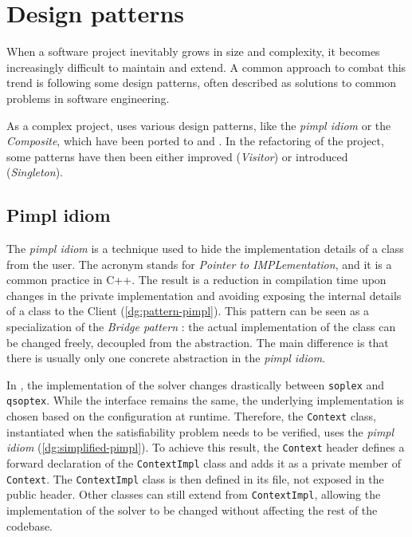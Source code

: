 \section{Design patterns}
\label{sec:patterns}

When a software project inevitably grows in size and complexity, it becomes increasingly difficult to maintain and extend.
A common approach to combat this trend is following some design patterns, often described as solutions to common problems in software engineering.

As a complex project, \dreal uses various design patterns, like the \textit{pimpl idiom} or the \textit{Composite}, which have been ported to \dlinearfour and \dlinear.
In the refactoring of the project, some patterns have then been either improved (\textit{Visitor}) or introduced (\textit{Singleton}).

\subsection*{Pimpl idiom}

The \textit{pimpl idiom} \cite{man:pimpl} is a technique used to hide the implementation details of a class from the user.
The acronym stands for \textit{Pointer to IMPLementation}, and it is a common practice in C++.
The result is a reduction in compilation time upon changes in the private implementation and avoiding exposing the internal details of a class to the Client (\autoref{dg:pattern-pimpl}).
This pattern can be seen as a specialization of the \textit{Bridge pattern} \cite{book:gof}: the actual implementation of the class can be changed freely, decoupled from the abstraction.
The main difference is that there is usually only one concrete abstraction in the \textit{pimpl idiom}.


In \dlinear, the implementation of the solver changes drastically between \texttt{soplex} and \texttt{qsoptex}.
While the interface remains the same, the underlying implementation is chosen based on the configuration at runtime.
Therefore, the \texttt{Context} class, instantiated when the satisfiability problem needs to be verified, uses the \textit{pimpl idiom} (\autoref{dg:simplified-pimpl}).
To achieve this result, the \texttt{Context} header defines a forward declaration of the \texttt{ContextImpl} class and adds it as a private member of \texttt{Context}.
The \texttt{ContextImpl} class is then defined in its file, not exposed in the public header.
Other classes can still extend from \texttt{ContextImpl}, allowing the implementation of the solver to be changed without affecting the rest of the codebase.

